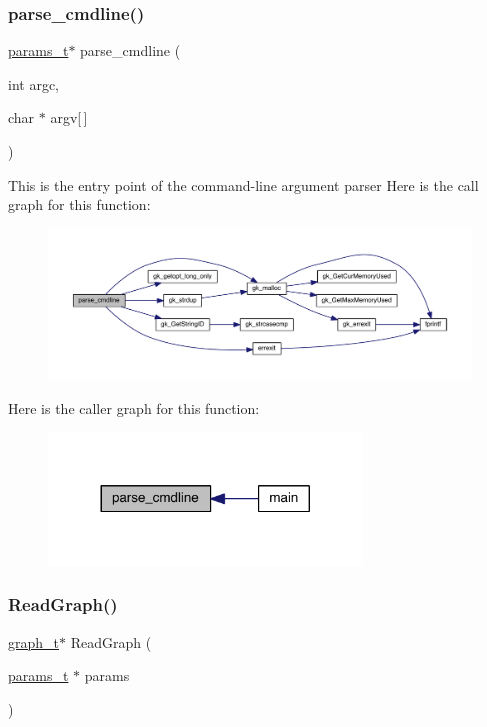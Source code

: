 \subsubsection{\texorpdfstring{parse\+\_\+cmdline()}{parse\_cmdline()}}
{\footnotesize\ttfamily \hyperlink{a00706}{params\+\_\+t}$\ast$ parse\+\_\+cmdline (\begin{DoxyParamCaption}\item[{int}]{argc,  }\item[{char $\ast$}]{argv\mbox{[}$\,$\mbox{]} }\end{DoxyParamCaption})}

This is the entry point of the command-\/line argument parser Here is the call graph for this function\+:\nopagebreak
\begin{figure}[H]
\begin{center}
\leavevmode
\includegraphics[width=350pt]{a00948_a0e7ce196a2f8882777957bf898739f6f_cgraph}
\end{center}
\end{figure}
Here is the caller graph for this function\+:\nopagebreak
\begin{figure}[H]
\begin{center}
\leavevmode
\includegraphics[width=236pt]{a00948_a0e7ce196a2f8882777957bf898739f6f_icgraph}
\end{center}
\end{figure}
\mbox{\label{a00948_ac8fe4a21ae3e0e01afdba3fedf1c6123}} 
\subsubsection{\texorpdfstring{Read\+Graph()}{ReadGraph()}}
{\footnotesize\ttfamily \hyperlink{a00734}{graph\+\_\+t}$\ast$ Read\+Graph (\begin{DoxyParamCaption}\item[{\hyperlink{a00706}{params\+\_\+t} $\ast$}]{params }\end{DoxyParamCaption})}

